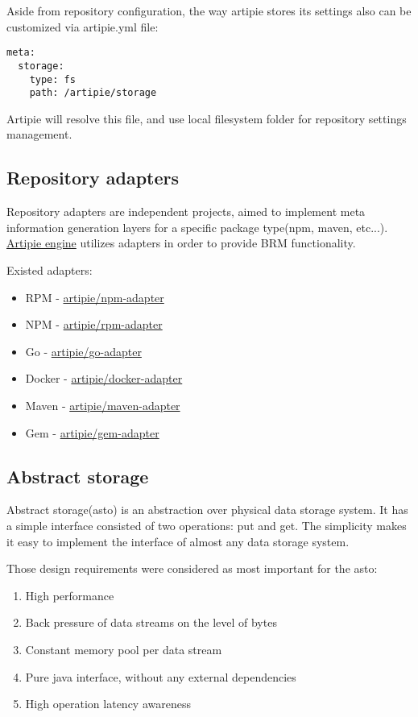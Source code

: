 \documentclass[12pt,oneside]{article}
\begin{document}
Aside from repository configuration, the way artipie stores its settings
also can be customized via artipie.yml file:
\begin{Verbatim}[tabsize=2]
meta:
  storage:
    type: fs
    path: /artipie/storage
\end{Verbatim}
Artipie will resolve this file, and use local filesystem folder for repository settings management. 

\subsection{Repository adapters}
Repository adapters are independent projects, 
aimed to implement meta information generation
layers for a specific package type(npm, maven, etc...).
\hyperref[sec:arti-engine]{Artipie engine} utilizes adapters in order to provide BRM functionality.

Existed adapters:
\begin{itemize}
	\item RPM - \href{https://github.com/artipie/npm-adapter}{artipie/npm-adapter}
	\item NPM - \href{https://github.com/artipie/rpm-adapter}{artipie/rpm-adapter}
	\item Go - \href{https://github.com/artipie/go-adapter}{artipie/go-adapter}
	\item Docker - \href{https://github.com/artipie/go-adapter}{artipie/docker-adapter}
	\item Maven - \href{https://github.com/artipie/go-adapter}{artipie/maven-adapter}
	\item Gem - \href{https://github.com/artipie/go-adapter}{artipie/gem-adapter}
\end{itemize}

\subsection{Abstract storage}
\label{sec:asto}
Abstract storage(asto) is an abstraction over physical data storage system.
It has a simple interface consisted of two operations: put and get.
The simplicity makes it easy to implement the interface of almost any data storage system.

Those design requirements were considered as most important for the asto: 
\begin{enumerate}
  \item High performance
  \item Back pressure of data streams on the level of bytes
	\item Constant memory pool per data stream
	\item Pure java interface, without any external dependencies
	\item High operation latency awareness
\end{enumerate}
\end{document}
